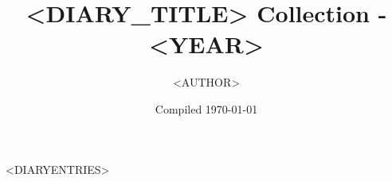 \documentclass[letterpaper,11pt]{article}
\title{<DIARY_TITLE> Collection - <YEAR>}
\author{<AUTHOR>}
\date{Compiled \today}
\begin{document}
\tableofcontents
\thispagestyle{empty}
\newpage

<DIARYENTRIES>
\end{document}
